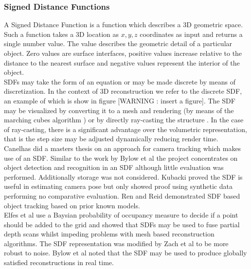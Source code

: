 \subsubsection{Signed Distance Functions}

A Signed Distance Function \cite{Curless96Volumetric} is a function which describes a 3D geometric space. Such a function takes a 3D location as $x,y,z$ coordinates as input and returns a single number value. The value describes the geometric detail of a particular object. Zero values are surface interfaces, positive values increase relative to the distance to the nearest surface and negative values represent the interior of the object. \\

SDFs may take the form of an equation or may be made discrete by means of discretization. In the context of 3D reconstruction we refer to the discrete SDF, an example of which is show in figure [WARNING : insert a figure]. The SDF may be visualized by converting it to a mesh and rendering (by means of the marching cubes algorithm \cite{Cubes87High}) or by directly ray-casting the structure \cite{Parker98Interactive}. In the case of ray-casting, there is a significant advantage over the volumetric representation, that is the step size may be adjusted dynamically reducing render time. \\

Canelhas \cite{Canelhas12Scene} did a masters thesis on an approach for camera tracking which makes use of an SDF. Similar to the work by Bylow et al \cite{Bylow13Real} the project concentrates on object detection and recognition in an SDF although little evaluation was performed. Additionally storage was not considered. Kubacki \cite{Kubacki12Registration} proved the SDF is useful in estimating camera pose but only showed proof using synthetic data performing no comparative evaluation. Ren and Reid \cite{Ren12Unified}  demonstrated SDF based object tracking based on prior known models. \\

Elfes et al \cite{Elfes87Sensor} use a Baysian probability of occupancy measure to decide if a point should be added to the grid and showed that SDFs may be used to fuse partial depth scans whilst impeding problems with mesh based reconstruction algorithms. The SDF representation was modified by Zach et al \cite{Zach07Globally} to be more robust to noise. Bylow et al noted that the SDF may be used to produce globally satisfied reconstructions in real time. \\


